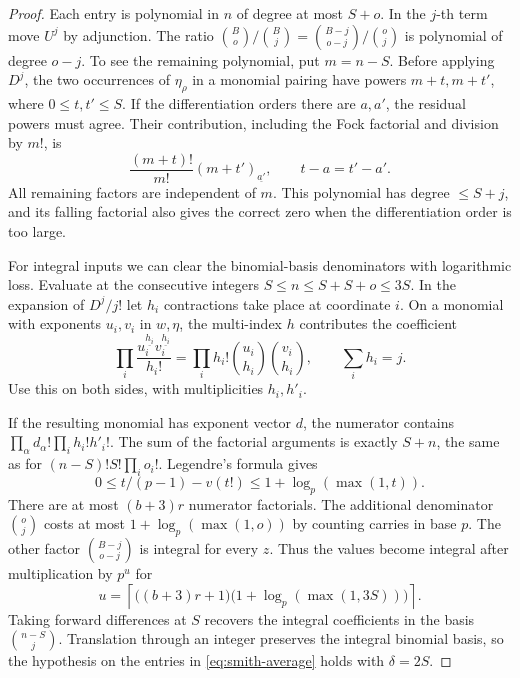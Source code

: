 \begin{proof}
Each entry is polynomial in \(n\) of degree at most \(S+o\).
In the \(j\)-th term move \(U^j\) by adjunction.
The ratio \(\binom Bo/\binom Bj=\binom{B-j}{o-j}/\binom oj\)
is polynomial of degree \(o-j\). To see the remaining polynomial,
put \(m=n-S\). Before applying \(D^j\), the two occurrences of
\(\eta_\rho\) in a monomial pairing have powers \(m+t,m+t'\),
where \(0\le t,t'\le S\). If the differentiation orders there
are \(a,a'\), the residual powers must agree. Their contribution,
including the Fock factorial and division by \(m!\), is
\[
   \frac{(m+t)!}{m!}(m+t')_{\underline{a'}},
       \qquad t-a=t'-a' .
\]
All remaining factors are independent of \(m\). This polynomial
has degree \(\le S+j\), and its falling factorial also gives the
correct zero when the differentiation order is too large.

For integral inputs we can clear the binomial-basis denominators
with logarithmic loss. Evaluate at the consecutive integers
\(S\le n\le S+S+o\le3S\). In the expansion of \(D^j/j!\)
let \(h_i\) contractions take place at coordinate \(i\).
On a monomial with exponents \(u_i,v_i\) in \(w,\eta\), the multi-index \(h\) contributes the coefficient
\[
 \prod_i\frac{u_i^{\underline{h_i}}v_i^{\underline{h_i}}}{h_i!} =\prod_i h_i!\binom{u_i}{h_i}\binom{v_i}{h_i},\qquad \sum_i h_i=j.
\]
Use this on both sides, with multiplicities \(h_i,h'_i\).

If the resulting monomial has exponent vector \(d\), the
numerator contains \(\prod_\alpha d_\alpha!\prod_i h_i!h'_i!\).
The sum of the factorial arguments is exactly \(S+n\), the
same as for \((n-S)! S!\prod_i o_i!\). Legendre's formula
gives
\[
  0\le t/(p-1)-v(t!)\le 1+\log_p(\max(1,t)).
\]
There are at most \((b+3)r\) numerator factorials. The additional
denominator \(\binom oj\) costs at most \(1+\log_p(\max(1,o))\)
by counting carries in base \(p\). The other factor
\(\binom{B-j}{o-j}\) is integral for every \(z\). Thus the
values become integral after multiplication by \(p^u\) for
\[
 u=\left\lceil\big((b+3)r+1\big)
                \big(1+\log_p(\max(1,3S))\big)\right\rceil .
\]
Taking forward differences at \(S\) recovers the integral
coefficients in the basis \(\binom{n-S}{j}\). Translation
through an integer preserves the integral binomial basis,
so the hypothesis on the entries in \eqref{eq:smith-average}
holds with \(\delta=2S\).


\end{proof}
